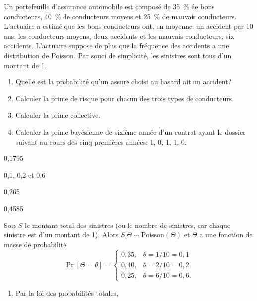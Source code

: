 
\begin{exercice}
  Un portefeuille d'assurance automobile est composé de 35~\% de bons
  conducteurs, 40~\% de conducteurs moyens et 25~\% de mauvais
  conducteurs. L'actuaire a estimé que les bons conducteurs ont, en
  moyenne, un accident par 10 ans, les conducteurs moyens, deux
  accidents et les mauvais conducteurs, six accidents. L'actuaire
  suppose de plus que la fréquence des accidents a une distribution de
  Poisson. Par souci de simplicité, les sinistres sont tous d'un
  montant de 1.
  \begin{enumerate}
  \item Quelle est la probabilité qu'un assuré choisi au hasard ait un
    accident?
  \item Calculer la prime de risque pour chacun des trois types de
    conducteurs.
  \item Calculer la prime collective.
  \item Calculer la prime bayésienne de sixième année d'un contrat
    ayant le dossier suivant au cours des cinq premières années: 1, 0,
    1, 1, 0.
  \end{enumerate}
  \begin{rep}
    \begin{inparaenum}
    \item 0,1795
    \item 0,1, 0,2 et 0,6
    \item 0,265
    \item 0,4585
    \end{inparaenum}
  \end{rep}
  \begin{sol}
    Soit $S$ le montant total des sinistres (ou le nombre de
    sinistres, car chaque sinistre est d'un montant de 1).  Alors
    $S|\Theta \sim \text{Poisson}(\Theta)$ et $\Theta$ a une fonction
    de masse de probabilité
    \begin{equation*}
      \Pr[\Theta = \theta] =
      \begin{cases}
        0,35, & \theta = 1/10 = 0,1 \\
        0,40, & \theta = 2/10 = 0,2 \\
        0,25, & \theta = 6/10 = 0,6.
      \end{cases}
    \end{equation*}
    \begin{enumerate}
    \item Par la loi des probabilités totales,

\end{enumerate}
\end{sol}
\end{exercice}
